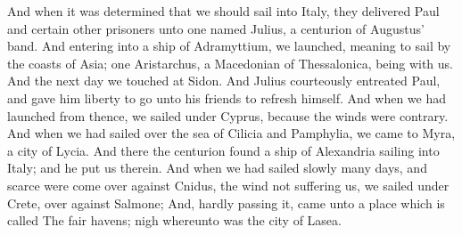  And when it was determined that we should sail into Italy,
they delivered Paul and certain other prisoners unto one named Julius, a
centurion of Augustus' band.  And entering into a ship of
Adramyttium, we launched, meaning to sail by the coasts of Asia; one
Aristarchus, a Macedonian of Thessalonica, being with us. 
And the next day we touched at Sidon. And Julius courteously entreated
Paul, and gave him liberty to go unto his friends to refresh himself.
 And when we had launched from thence, we sailed under
Cyprus, because the winds were contrary.  And when we had
sailed over the sea of Cilicia and Pamphylia, we came to Myra, a city of
Lycia.  And there the centurion found a ship of Alexandria
sailing into Italy; and he put us therein.  And when we had
sailed slowly many days, and scarce were come over against Cnidus, the
wind not suffering us, we sailed under Crete, over against Salmone;
 And, hardly passing it, came unto a place which is called
The fair havens; nigh whereunto was the city of Lasea.

